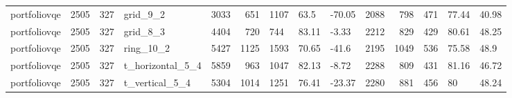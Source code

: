 \begin{longtable}{lrrlrrlllrrlll}
portfoliovqe & 2505 & 327 & grid\_9\_2 & 3033 & 651 & 1107 & 63.5 & -70.05 & 2088 & 798 & 471 & 77.44 & 40.98 \\
portfoliovqe & 2505 & 327 & grid\_8\_3 & 4404 & 720 & 744 & 83.11 & -3.33 & 2212 & 829 & 429 & 80.61 & 48.25 \\
portfoliovqe & 2505 & 327 & ring\_10\_2 & 5427 & 1125 & 1593 & 70.65 & -41.6 & 2195 & 1049 & 536 & 75.58 & 48.9 \\
portfoliovqe & 2505 & 327 & t\_horizontal\_5\_4 & 5859 & 963 & 1047 & 82.13 & -8.72 & 2288 & 809 & 431 & 81.16 & 46.72 \\
portfoliovqe & 2505 & 327 & t\_vertical\_5\_4 & 5304 & 1014 & 1251 & 76.41 & -23.37 & 2280 & 881 & 456 & 80 & 48.24 \\
\end{longtable}
